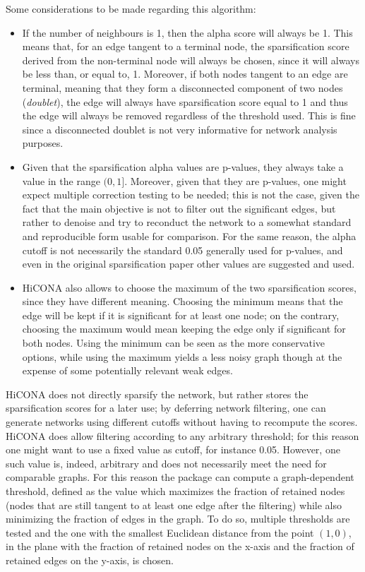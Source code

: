 Some considerations to be made regarding this algorithm: 
\begin{itemize}\tightlist
  \item If the number of neighbours is 1, then the alpha score will always be 1. This means that, for an edge tangent to a terminal node, the sparsification score derived from the non-terminal node will always be chosen, since it will always be less than, or equal to, 1. Moreover, if both nodes tangent to an edge are terminal, meaning that they form a disconnected component of two nodes (\emph{doublet}), the edge will always have sparsification score equal to 1 and thus the edge will always be removed regardless of the threshold used. This is fine since a disconnected doublet is not very informative for network analysis purposes.
  \item Given that the sparsification alpha values are p-values, they always take a value in the range $(0,1]$. Moreover, given that they are p-values, one might expect multiple correction testing to be needed; this is not the case, given the fact that the main objective is not to filter out the significant edges, but rather to denoise and try to reconduct the network to a somewhat standard and reproducible form usable for comparison. For the same reason, the alpha cutoff is not necessarily the standard 0.05 generally used for p-values, and even in the original sparsification paper other values are suggested and used.
  \item HiCONA also allows to choose the maximum of the two sparsification scores, since they have different meaning. Choosing the minimum means that the edge will be kept if it is significant for at least one node; on the contrary, choosing the maximum would mean keeping the edge only if significant for both nodes. Using the minimum can be seen as the more conservative options, while using the maximum yields a less noisy graph though at the expense of some potentially relevant weak edges.
\end{itemize}

HiCONA does not directly sparsify the network, but rather stores the sparsification scores for a later use; by deferring network filtering, one can generate networks using different cutoffs without having to recompute the scores. HiCONA does allow filtering according to any arbitrary threshold; for this reason one might want to use a fixed value as cutoff, for instance 0.05. However, one such value is, indeed, arbitrary and does not necessarily meet the need for comparable graphs. For this reason the package can compute a graph-dependent threshold, defined as the value which maximizes the fraction of retained nodes (nodes that are still tangent to at least one edge after the filtering) while also minimizing the fraction of edges in the graph. To do so, multiple thresholds are tested and the one with the smallest Euclidean distance from the point $(1,0)$, in the plane with the fraction of retained nodes on the x-axis and the fraction of retained edges on the y-axis, is chosen.

